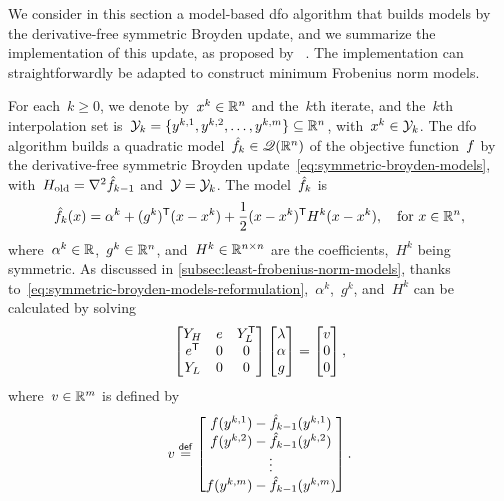 We consider in this section a model-based \gls{dfo} algorithm that builds models by the derivative-free symmetric Broyden update, and we summarize the implementation of this update, as proposed by \citeauthor{Powell_2004b}~\cite{Powell_2004b,Powell_2004c}.
The implementation can straightforwardly be adapted to construct minimum Frobenius norm models.

For each~$k \ge 0$, we denote by~$x^k \in \mathbb{R}^n$ and the~$k$th iterate, and the~$k$th interpolation set is~$\xpt[k] = \set{y^{k, 1}, y^{k, 2}, \dots, y^{k, m}} \subseteq \R^n$, with~$x^k \in \xpt[k]$.
The \gls{dfo} algorithm builds a quadratic model~$\objm[k] \in \qpoly$ of the objective function~$f$ by the derivative-free symmetric Broyden update~\cref{eq:symmetric-broyden-models}, with~$H_{\text{old}} = \nabla^2 \objm[k - 1]$ and~$\xpt = \xpt[k]$.
The model~$\objm[k]$ is
\begin{equation*}
    \objm[k](x) = \alpha^k + (g^k)^{\T} (x - x^k) + \frac{1}{2} (x - x^k)^{\T} H^k (x - x^k), \quad \text{for~$x \in \R^n$},
\end{equation*}
where~$\alpha^k \in \mathbb{R}$,~$g^k \in \mathbb{R}^n$, and~$H^k \in \mathbb{R}^{n \times n}$ are the coefficients,~$H^k$ being symmetric.
As discussed in \cref{subsec:least-frobenius-norm-models}, thanks to~\cref{eq:symmetric-broyden-models-reformulation},~$\alpha^k$,~$g^k$, and~$H^k$ can be calculated by solving
\begin{equation}
    \label{eq:least-frobenius-kkt-system-2}
    \begin{bmatrix}
        Y_H     & e & Y_L^{\mathsf{T}}\\
        e^{\mathsf{T}}  & 0 & 0\\
        Y_L     & 0 & 0
    \end{bmatrix}
    \begin{bmatrix}
        \lambda\\
        \alpha\\
        g
    \end{bmatrix}
    =
    \begin{bmatrix}
        v\\
        0\\
        0
    \end{bmatrix},
\end{equation}
where~$v \in \mathbb{R}^m$ is defined by
\begin{equation*}
    v \eqdef
    \begin{bmatrix}
        \obj(y^{k, 1}) - \objm[k - 1](y^{k, 1})\\
        \obj(y^{k, 2}) - \objm[k - 1](y^{k, 2})\\
        \vdots\\
        \obj(y^{k, m}) - \objm[k - 1](y^{k, m})
    \end{bmatrix}.
\end{equation*}
